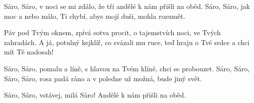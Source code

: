 \beginchorus{}
Sáro, Sáro, v noci se mi zdálo,
že tři andělé k nám přišli na oběd.
Sáro, Sáro, jak moc a nebo málo,
Ti chybí, abys mojí duši, mohla rozumět.
\endchorus{}

\beginverse{}
Páv pod Tvým oknem, zpívá sotva procit,
o tajemstvích noci, ve Tvých zahradách.
A já, potulný kejklíř, co svázali mu ruce,
teď hraju o Tvé srdce a chci mít Tě nadosah!
\endverse{}

\beginchorus{}
Sáro, Sáro, pomalu a líně,
s hlavou na Tvém klíně, chci se probouzet.
Sáro, Sáro, Sáro, Sáro, rosa padá ráno
a v poledne už možná, bude jiný svět.
\endchorus{}

\beginverse*{}
Sáro, Sáro, vstávej, milá Sáro!
Andělé k nám přišli na oběd.
\endverse{}

\endsong{}
